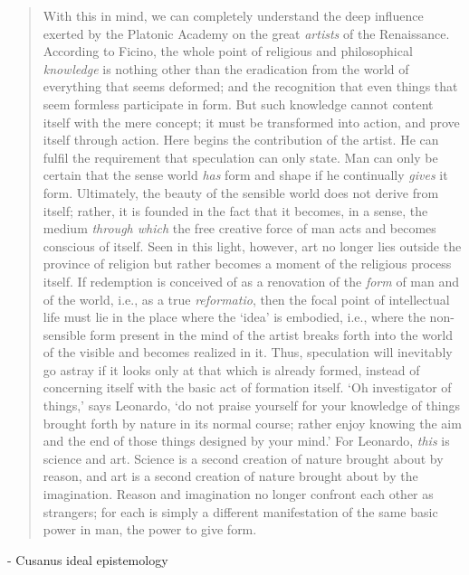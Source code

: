 \begin{quote}
    With this in mind, we can completely understand the deep influence exerted by the Platonic Academy on the great \emph{artists} of the Renaissance.  According to Ficino, the whole point of religious and philosophical \emph{knowledge} is nothing other than the eradication from the world of everything that seems deformed; and the recognition that even things that seem formless participate in form.  But such knowledge cannot content itself with the mere concept; it must be transformed into action, and prove itself through action.  Here begins the contribution of the artist.  He can fulfil the requirement that speculation can only state.  Man can only be certain that the sense world \emph{has} form and shape if he continually \emph{gives} it form.  Ultimately, the beauty of the sensible world does not derive from itself; rather, it is founded in the fact that it becomes, in a sense, the medium \emph{through which} the free creative force of man acts and becomes conscious of itself.  Seen in this light, however, art no longer lies outside the province of religion but rather becomes a moment of the religious process itself.  If redemption is conceived of as a renovation of the \emph{form} of man and of the world, i.e., as a true \emph{reformatio}, then the focal point of intellectual life must lie in the place where the `idea' is embodied, i.e., where the non-sensible form present in the mind of the artist breaks forth into the world of the visible and becomes realized in it.  Thus, speculation will inevitably go astray if it looks only at that which is already formed, instead of concerning itself with the basic act of formation itself.  `Oh investigator of things,' says Leonardo, `do not praise yourself for your knowledge of things brought forth by nature in its normal course; rather enjoy knowing the aim and the end of those things designed by your mind.'  For Leonardo, \emph{this} is science and art.  Science is a second creation of nature brought about by reason, and art is a second creation of nature brought about by the imagination.  Reason and imagination no longer confront each other as strangers; for each is simply a different manifestation of the same basic power in man, the power to give form.
    \citep[p. 66-67]{Cassirer1927}
\end{quote}

- Cusanus ideal epistemology

